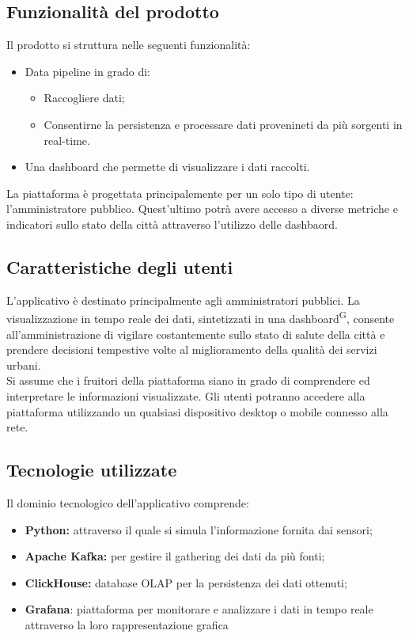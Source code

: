 \documentclass[8pt]{article}
\newcommand{\glossterm}[1]{#1\textsuperscript{G}} %
\begin{document}
\subsection{Funzionalità del prodotto}
Il prodotto si struttura nelle seguenti funzionalità:
\begin{itemize}
	\setlength\itemsep{0em}
  \item Data pipeline in grado di:
  \begin{itemize}  
  \item Raccogliere dati; 
	\item Consentirne la persistenza e processare dati provenineti da più sorgenti in real-time.
  \end{itemize}  
	\item Una dashboard che permette di visualizzare i dati raccolti.
\end{itemize}
La piattaforma è progettata principalemente per un solo tipo di utente: l'amministratore pubblico. Quest'ultimo potrà avere accesso a diverse metriche e indicatori sullo stato della città attraverso l'utilizzo delle dashbaord.
\subsection{Caratteristiche degli utenti} \label{sec:users}
L'applicativo è destinato principalmente agli amministratori pubblici. La visualizzazione in tempo reale dei dati, sintetizzati in una \glossterm{dashboard}, consente all'amministrazione di vigilare costantemente sullo stato di salute della città e prendere decisioni tempestive volte al miglioramento della qualità dei servizi urbani. \\ Si assume che i fruitori della piattaforma siano in grado di comprendere ed interpretare le informazioni visualizzate. Gli utenti potranno accedere alla piattaforma utilizzando un qualsiasi dispositivo desktop o mobile connesso alla rete.

\subsection{Tecnologie utilizzate}
Il dominio tecnologico dell'applicativo comprende:
\begin{itemize}
	\setlength\itemsep{0em}
  \item \textbf{Python: }attraverso il quale si simula l'informazione fornita dai sensori;
  \item \textbf{Apache Kafka:} per gestire il gathering dei dati da più fonti;
  \item \textbf{ClickHouse:} database OLAP per la persistenza dei dati ottenuti;
  \item \textbf{Grafana}: piattaforma per monitorare e analizzare i dati in tempo reale attraverso la loro rappresentazione grafica
\end{itemize}
\end{document}
